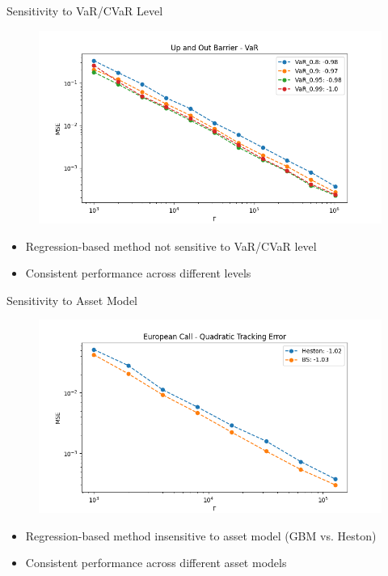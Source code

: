 \documentclass[9pt,handout]{beamer}
\begin{document}
\begin{frame}{Sensitivity to VaR/CVaR Level}

\begin{figure}
    \includegraphics[width=\textwidth]{../project1/figures/figure9a.png}
\end{figure}

\begin{itemize}
    \item Regression-based method not sensitive to VaR/CVaR level
    \item Consistent performance across different levels
\end{itemize}

\end{frame}

\begin{frame}{Sensitivity to Asset Model}

\begin{figure}
    \includegraphics[width=\textwidth]{../project1/figures/figure10a.png}
\end{figure}

\begin{itemize}
    \item Regression-based method insensitive to asset model (GBM vs. Heston)
    \item Consistent performance across different asset models
\end{itemize}

\end{frame}
\end{document}

